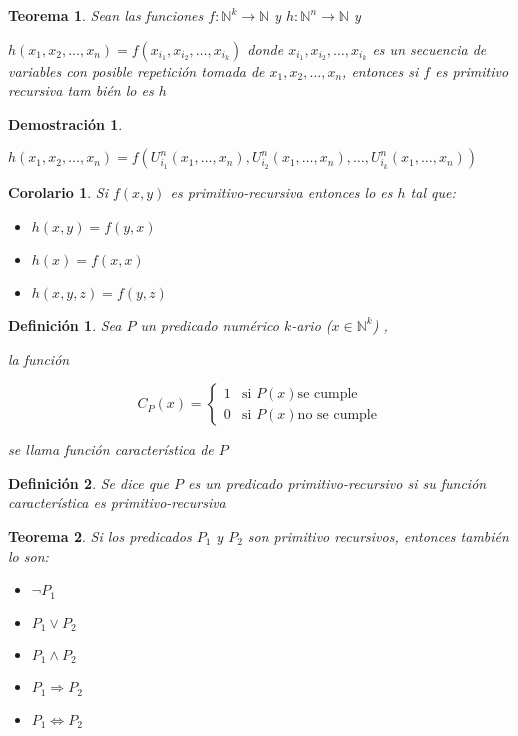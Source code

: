 \documentclass[a4paper,1pt]{report}
\newtheorem*{teo}{Teorema}
\newtheorem*{cor}{Corolario}
\newtheorem*{dem}{Demostración}
\newtheorem*{dfn}{Definición}
\begin{document}
\begin{teo}
 Sean las funciones $f:\mathbb{N}^k\rightarrow\mathbb{N}$ y $h:\mathbb{N}^n\rightarrow\mathbb{N}$ y
 
 $h(x_1,x_2,\dots,x_n)=f(x_{i_1},x_{i_2},\dots,x_{i_k})$ donde $x_{i_1},x_{i_2},\dots,x_{i_k}$ es un secuencia de variables con posible repetición tomada de $x_1,x_2,\dots,x_n$, entonces si $f$ es primitivo recursiva tam bién lo es $h$
\end{teo}

\begin{dem}


\end{dem}
 $h(x_1,x_2,\dots,x_n)=f(U^n_{i_1}(x_1,\dots,x_n),U^n_{i_2}(x_1,\dots,x_n),\dots,U^n_{i_k}(x_1,\dots,x_n))$
 
 \begin{cor}
  Si $f(x,y)$ es primitivo-recursiva entonces lo es $h$ tal que:
  \begin{itemize}
   \item $h(x,y)=f(y,x)$
   \item $h(x)=f(x,x)$
   \item $h(x,y,z) = f(y,z)$
  \end{itemize}

 \end{cor}
 
 \begin{dfn}
  Sea $P$ un predicado numérico $k$-ario ($x\in\mathbb{N}^k$) ,
  
  la función
  
  \begin{equation}
C_P(x) = 
\begin{cases}
1 & \text{si } P(x) \text{se cumple} \\
0   & \text{si } P(x) \text{no se cumple} 
\end{cases}
\end{equation}

se llama función característica de $P$
 \end{dfn}
 
\begin{dfn}
 Se dice que $P$ es un predicado primitivo-recursivo si su función característica es primitivo-recursiva
\end{dfn}

\begin{teo}
 Si los predicados $P_1$ y $P_2$ son primitivo recursivos, entonces también lo son:
 \begin{itemize}
  \item $\neg P_1$
  \item $P_1\vee P_2$
  \item $P_1\wedge P_2$
  \item $P_1\Rightarrow P_2$
  \item $P_1\Leftrightarrow P_2$
 \end{itemize}

\end{teo}
\end{document}
